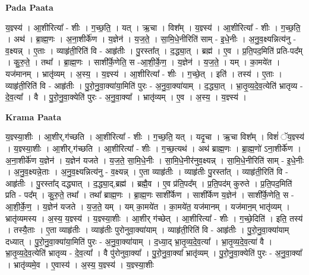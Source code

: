 \documentclass[17pt]{extarticle}
\begin{document}
\textbf{Pada Paata} \newline

य॒ज्ञ्स्य॑ । आ॒शीरित्या᳚ - शीः । ग॒च्छ॒ति॒ । यत् । ऋ॒चा । विश᳚म् । य॒ज्ञ्स्य॑ । आ॒शीरित्या᳚ - शीः । ग॒च्छ॒ति॒ । अथ॑ । ब्रा॒ह्म॒णः । अ॒ना॒शीर्के॑ण । य॒ज्ञेन॑ । य॒ज॒ते॒ । सा॒मि॒धे॒नीरिति॑ साम् - इ॒धे॒नीः । अ॒नु॒व॒क्ष्यन्नित्य॑नु - व॒क्ष्यन्न् । ए॒ताः । व्याहृ॑ती॒रिति॑ वि - आहृ॑तीः । पु॒रस्ता᳚त् । द॒द्ध्या॒त् । ब्रह्म॑ । ए॒व । प्र॒ति॒पद॒मिति॑ प्रति-पद᳚म् । कु॒रु॒ते॒ । तथा᳚ । ब्रा॒ह्म॒णः । साशी᳚र्के॒णेति॒ स -आ॒शी॒र्के॒ण॒ । य॒ज्ञेन॑ । य॒ज॒ते॒ । यम् । का॒मये॑त । यज॑मानम् । भ्रातृ॑व्यम् । अ॒स्य॒ । य॒ज्ञ्स्य॑ । आ॒शीरित्या᳚ - शीः । ग॒च्छे॒त् । इति॑ । तस्य॑ । ए॒ताः । व्याहृ॑ती॒रिति॑ वि - आहृ॑तीः । पु॒रो॒नु॒वा॒क्या॑या॒मिति॑ पुरः - अ॒नु॒वा॒क्या॑याम् । द॒द्ध्या॒त् । भ्रा॒तृ॒व्य॒दे॒व॒त्येति॑ भ्रातृव्य - दे॒व॒त्या᳚ । वै । पु॒रो॒नु॒वा॒क्येति॑ पुरः - अ॒नु॒वा॒क्या᳚ । भ्रातृ॑व्यम् । ए॒व । अ॒स्य॒ । य॒ज्ञ्स्य॑ ।  \newline


\textbf{Krama Paata} \newline

य॒ज्ञ्स्या॒शीः । आ॒शीर्,ग॑च्छति । आ॒शीरित्या᳚ - शीः । ग॒च्छ॒ति॒ यत् । यदृ॒चा । ऋ॒चा विश᳚म् । विशं॑ ॅय॒ज्ञ्स्य॑ । य॒ज्ञ्स्या॒शीः । आ॒शीर्,ग॑च्छति । आ॒शीरित्या᳚ - शीः । ग॒च्छ॒त्यथ॑ । अथ॑ ब्राह्म॒णः । ब्रा॒ह्म॒णो॑ ऽना॒शीर्के॑ण । अ॒ना॒शीर्के॑ण य॒ज्ञेन॑ । य॒ज्ञेन॑ यजते । य॒ज॒ते॒ सा॒मि॒धे॒नीः । सा॒मि॒धे॒नीर॑नुव॒क्ष्यन्न् । सा॒मि॒धे॒नीरिति॑ साम् - इ॒धे॒नीः । अ॒नु॒व॒क्ष्यन्ने॒ताः । अ॒नु॒व॒क्ष्यन्नित्य॑नु - व॒क्ष्यन्न् । ए॒ता व्याहृ॑तीः । व्याहृ॑तीः पु॒रस्ता᳚त् । व्याहृ॑ती॒रिति॑ वि - आहृ॑तीः । पु॒रस्ता᳚द् दद्ध्यात् । द॒द्ध्या॒द्,ब्रह्म॑ । ब्रह्मै॒व । ए॒व प्र॑ति॒पद᳚म् । प्र॒ति॒पद॑म् कुरुते । प्र॒ति॒पद॒मिति॑ प्रति - पद᳚म् । कु॒रु॒ते॒ तथा᳚ । तथा᳚ ब्राह्म॒णः । ब्रा॒ह्म॒णः साशी᳚र्केण । साशी᳚र्केण य॒ज्ञेन॑ । साशी᳚र्के॒णेति॒ स - आ॒शी॒र्के॒ण॒ । य॒ज्ञेन॑ यजते । य॒ज॒ते॒ यम् । यम् का॒मये॑त । का॒मये॑त॒ यज॑मानम् । यज॑मान॒म् भातृ॑व्यम् । भ्रातृ॑व्यमस्य । अ॒स्य॒ य॒ज्ञ्स्य॑ । य॒ज्ञ्स्या॒शीः । आ॒शीर् ग॑च्छेत् । आ॒शीरित्या᳚ - शीः । ग॒च्छे॒दिति॑ । इति॒ तस्य॑ । तस्यै॒ताः । ए॒ता व्याहृ॑तीः । व्याहृ॑तीः पुरोनुवा॒क्या॑याम् । व्याहृ॑ती॒रिति॑ वि - आहृ॑तीः । पु॒रो॒नु॒वा॒क्या॑याम् दध्यात् । पु॒रो॒नु॒वा॒क्या॑या॒मिति॑ पुरः - अ॒नु॒वा॒क्या॑याम् । द॒ध्या॒द् भ्रा॒तृ॒व्य॒दे॒व॒त्या᳚ । भ्रा॒तृ॒व्य॒दे॒व॒त्या॑ वै । भ्रा॒तृ॒व्य॒दे॒व॒त्येति॑ भ्रातृव्य - दे॒व॒त्या᳚ । वै पु॑रोनुवा॒क्या᳚ । पु॒रो॒नु॒वा॒क्या᳚ भ्रातृ॑व्यम् । पु॒रो॒नु॒वा॒क्येति॑ पुरः - अ॒नु॒वा॒क्या᳚ । भ्रातृ॑व्यमे॒व । ए॒वास्य॑ । अ॒स्य॒ य॒ज्ञ्स्य॑ । य॒ज्ञ्स्या॒शीः \newline
\end{document}
